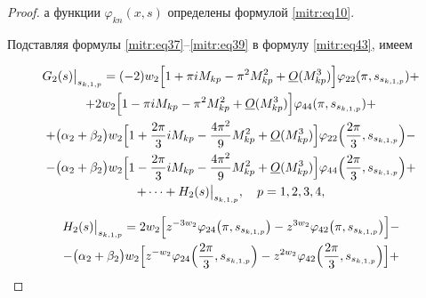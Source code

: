 \begin{proof}
а функции $\varphi_{kn}(x,s)$ определены формулой \eqref{mitr:eq10}.





Подставляя  формулы \eqref{mitr:eq37}--\eqref{mitr:eq39} в формулу \eqref{mitr:eq43}, имеем

\begin{multline}

\label{mitr:eq44}

G_2(s)\big|_{s_{k,1,p}}=

(-2)w_2\Big[1+\pi i M_{kp}-\pi^2 M^2_{kp}+\underline O(M^3_{kp})\Big]

\varphi_{22}({\pi},s_{s_{k,1,p}})+\\+

2w_2\Big[1-\pi i M_{kp}-\pi^2 M^2_{kp}+\underline O(M^3_{kp})\Big]

\varphi_{44}({\pi},s_{s_{k,1,p}})+\\

+

\big(\alpha_2+\beta_2\big)w_2

\Bigl[1+\frac{2\pi}3 i M_{kp}-\frac{4\pi^2}9 M^2_{kp}+\underline O(M^3_{kp})\Bigr]

\varphi_{22}\Bigl(\frac{2\pi}3,s_{s_{k,1,p}}\Bigr)-\\-

\big(\alpha_2+\beta_2\big)

w_2\Bigl[1-\frac{2\pi}3 i M_{kp}-\frac{4\pi^2}9 M^2_{kp}+\underline O(M^3_{kp})\Bigr]

\varphi_{44}\Bigl(\frac{2\pi}3,s_{s_{k,1,p}}\Bigr)+\\

+\dots+H_2(s)\big|_{s_{k,1,p}}, \quad

p=1,2,3,4,

\end{multline}

\begin{multline}

\label{mitr:eq45}

H_2(s)\big|_{s_{k,1,p}}=

2w_2\Big[z^{-3w_2}\varphi_{24}\big(\pi,s_{s_{k,1,p}}\big)- z^{3w_2}

\varphi_{42}\big(\pi,s_{s_{k,1,p}}\big)\Big]-\\-

\big(\alpha_2+\beta_2\big)

w_2\Bigl[z^{-w_2}\varphi_{24}\Bigl(\frac{2\pi}3,s_{s_{k,1,p}}\Bigr)- z^{2w_2}

\varphi_{42}\Bigl(\frac{2\pi}3,s_{s_{k,1,p}}\Bigr)\Bigr]+\\


\end{multline}
\end{proof}
